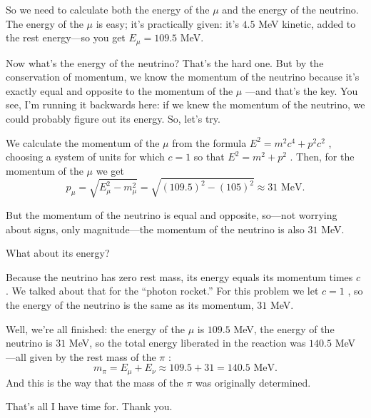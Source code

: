 \documentclass[11pt,oneside]{article}
\begin{document}
So we need to calculate both the energy of the \(\mu\) and the energy of the neutrino. The energy of the \(\mu\) is easy; it's practically given: it's \(4.5\) MeV kinetic, added to the rest energy---so you get \(E_\mu=109.5\) MeV.\par

Now what's the energy of the neutrino? That's the hard one. But by the conservation of momentum, we know the momentum of the neutrino because it's exactly equal and opposite to the momentum of the \(\mu\) ---and that's the key. You see, I'm running it backwards here: if we knew the momentum of the neutrino, we could probably figure out its energy. So, let's try.\par

We calculate the momentum of the \(\mu\) from the formula \(E^2 = m^2c^4 + p^2c^2\) , choosing a system of units for which \(c=1\) so that \(E^2 = m^2 + p^2\) . Then, for the momentum of the \(\mu\) we get 
\begin{equation*} \tag{3.35}
\label{Eq:TIPS:3:35} p_\mu = \sqrt{E_\mu^2-m_\mu^2} = \sqrt{(109.5)^2-(105)^2} \approx 31\text{ MeV}. \end{equation*}
\par

But the momentum of the neutrino is equal and opposite, so---not worrying about signs, only magnitude---the momentum of the neutrino is also \(31\) MeV.\par

What about its energy?\par

Because the neutrino has zero rest mass, its energy equals its momentum times \(c\) . We talked about that for the ``photon rocket.'' For this problem we let \(c=1\) , so the energy of the neutrino is the same as its momentum, \(31\) MeV.\par

Well, we're all finished: the energy of the \(\mu\) is \(109.5\) MeV, the energy of the neutrino is \(31\) MeV, so the total energy liberated in the reaction was \(140.5\) MeV---all given by the rest mass of the \(\pi\) : 
\begin{equation*} \tag{3.36}
\label{Eq:TIPS:3:36} m_\pi = E_\mu + E_\nu \approx 109.5 + 31 = 140.5\text{ MeV}. \end{equation*}
 And this is the way that the mass of the \(\pi\) was originally determined.\par

That's all I have time for. Thank you.\par
\end{document}
